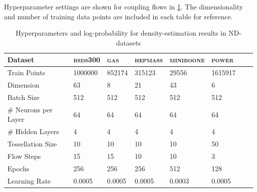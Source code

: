 Hyperparameter settings are shown for coupling flows in \cref{tab:nf_nd}. The dimensionality and number of training data points are included in each table for reference. 
\begin{table}[!htb]
  \small
  \caption{Hyperparameters and log-probability for density-estimation results in ND-datasets}
  \label{tab:nf_nd}
  \vspace{-1em}
  \begin{center}
  \begin{tabular}{llllllll}
    \toprule
    Dataset &  \textsc{bsds}\footnotesize300 & \textsc{gas} & \textsc{hepmass} & \textsc{miniboone} & \textsc{power} \\
    \midrule
    Train Points         &  1000000 &  852174 &  315123 &     29556 &  1615917  \\
    Dimension            &       63 &       8 &      21 &        43 &        6  \\
    \midrule
    Batch Size           &      512 &     512 &     512 &       512 &      512  \\
    \# Neurons per Layer &       64 &      64 &      64 &        64 &       64  \\
    \# Hidden Layers     &        4 &       4 &       4 &         4 &        4  \\
    Tessellation Size    &       10 &      10 &      10 &        10 &       50  \\
    Flow Steps           &       15 &      15 &      10 &        10 &        3  \\
    Epochs               &      256 &     256 &     256 &       512 &      128  \\
    Learning Rate        &   0.0005 &  0.0005 &  0.0005 &    0.0003 &   0.0005  \\
    \bottomrule
  \end{tabular}
\end{center}
\end{table}

